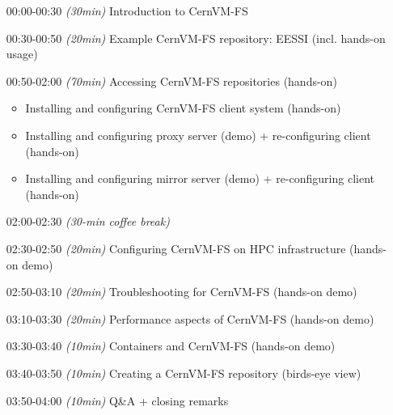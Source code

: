 \begin{itemize}[style=standard, labelwidth=1.9cm]

    \item [00:00-00:30] \emph{(30min)} Introduction to CernVM-FS
    \item [00:30-00:50] \emph{(20min)} Example CernVM-FS repository: EESSI (incl. hands-on usage)
    \item [00:50-02:00] \emph{(70min)} Accessing CernVM-FS repositories (hands-on)
    \begin{itemize}
        \item Installing and configuring CernVM-FS client system (hands-on)
        \item Installing and configuring proxy server (demo) + re-configuring client (hands-on)
        \item Installing and configuring mirror server (demo) + re-configuring client (hands-on)
    \end{itemize}

    \item [02:00-02:30] \emph{(30-min coffee break)}

    \item [02:30-02:50] \emph{(20min)} Configuring CernVM-FS on HPC infrastructure (hands-on demo)
    \item [02:50-03:10] \emph{(20min)} Troubleshooting for CernVM-FS (hands-on demo)
    \item [03:10-03:30] \emph{(20min)} Performance aspects of CernVM-FS (hands-on demo)
    \item [03:30-03:40] \emph{(10min)} Containers and CernVM-FS (hands-on demo)
    \item [03:40-03:50] \emph{(10min)} Creating a CernVM-FS repository (birds-eye view)
    \item [03:50-04:00] \emph{(10min)} Q\&A + closing remarks

\end{itemize}

